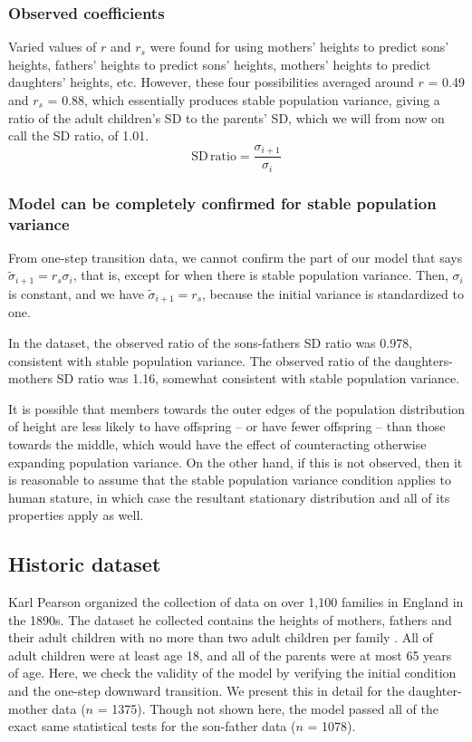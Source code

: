 \documentclass[letterpaper,10pt]{article} %
\begin{document}
\subsubsection*{Observed coefficients}
Varied values of $r$ and $r_s$ were found for using mothers' heights to predict sons' heights, fathers' heights to predict sons' heights, mothers' heights to predict daughters' heights, etc. However, these four possibilities averaged around $r$ = 0.49 and $r_s$ = 0.88, which essentially produces stable population variance, giving a ratio of the adult children's SD to the parents' SD, which we will from now on call the SD ratio, of 1.01.
$$\mathrm{SD} \, \mathrm{ratio} = \frac{\sigma_{i+1}}{\sigma_i}$$

\subsubsection*{Model can be completely confirmed for stable population variance}
From one-step transition data, we cannot confirm the part of our model that says $\tilde{\sigma}_{i+1} = r_s \sigma_i$, that is, except for when there is stable population variance. Then, $\sigma_i$ is constant, and we have $\tilde{\sigma}_{i+1} = r_s$, because the initial variance is standardized to one.

In the dataset, the observed ratio of the sons-fathers SD ratio was 0.978, consistent with stable population variance. The observed ratio of the daughters-mothers SD ratio was 1.16, somewhat consistent with stable population variance. 

It is possible that members towards the outer edges of the population distribution of height are less likely to have offspring -- or have fewer offspring -- than those towards the middle, which would have the effect of counteracting otherwise expanding population variance. On the other hand, if this is not observed, then it is reasonable to assume that the stable population variance condition applies to human stature, in which case the resultant stationary distribution and all of its properties apply as well. 



\subsection{Historic dataset}

Karl Pearson organized the collection of data on over 1,100 families in England in the 1890s. The dataset he collected contains the heights of mothers, fathers and their adult children with no more than two adult children per family \cite{pearson}. All of adult children were at least age 18, and all of the parents were at most 65 years of age. Here, we check the validity of the model by verifying the initial condition and the one-step downward transition. We present this in detail for the daughter-mother data ($n$ = 1375). Though not shown here, the model passed all of the exact same statistical tests for the son-father data ($n$ = 1078).
\end{document}
